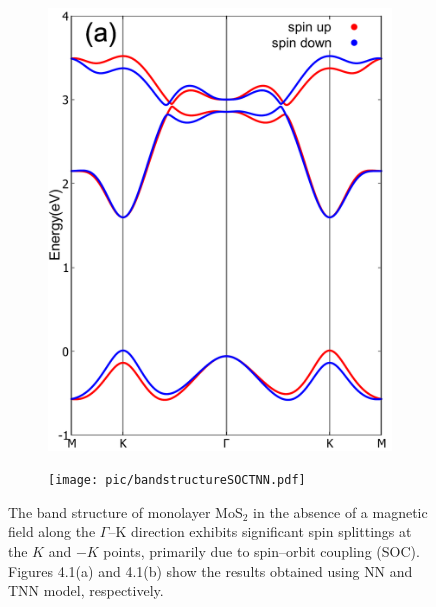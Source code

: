 \begin{figure}[htb]
\begin{subfigure}[b]{0.495\textwidth}
	\centering
	\includegraphics[width=\linewidth]{pic/bandstructureSOC.pdf}
\end{subfigure}
\begin{subfigure}[b]{0.495\textwidth}
	\centering
	\texttt{[image: pic/bandstructureSOCTNN.pdf]}
\end{subfigure}
\caption[Banstructure of NN and TNN monolayer MoS$_{2}$ with SOC without magnetic field.]{The band structure of monolayer MoS$_2$ in the absence of a magnetic field along the $\Gamma$–K direction exhibits significant spin splittings at the $K$ and $-K$ points, primarily due to spin–orbit coupling (SOC). Figures 4.1(a) and 4.1(b) show the results obtained using \ac{NN} and \ac{TNN} model, respectively.
}
\end{figure}
